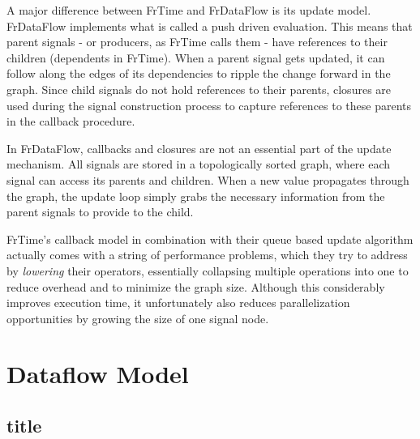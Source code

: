 A major difference between FrTime and FrDataFlow is its update model. FrDataFlow implements what is called a push driven evaluation. This means that parent signals - or producers, as FrTime calls them - have references to their children (dependents in FrTime). When a parent signal gets updated, it can follow along the edges of its dependencies to ripple the change forward in the graph. Since child signals do not hold references to their parents, closures are used during the signal construction process to capture references to these parents in the callback procedure.

In FrDataFlow, callbacks and closures are not an essential part of the update mechanism. All signals are stored in a topologically sorted graph, where each signal can access its parents and children. When a new value propagates through the graph, the update loop simply grabs the necessary information from the parent signals to provide to the child.

FrTime's callback model in combination with their queue based update algorithm actually comes with a string of performance problems, which they try to address by \textit{lowering} \cite{burchett_lowering:_2007} their operators, essentially collapsing multiple operations into one to reduce overhead and to minimize the graph size. Although this considerably improves execution time, it unfortunately also reduces parallelization opportunities by growing the size of one signal node. 


\section{Dataflow Model}

\subsection{title}



